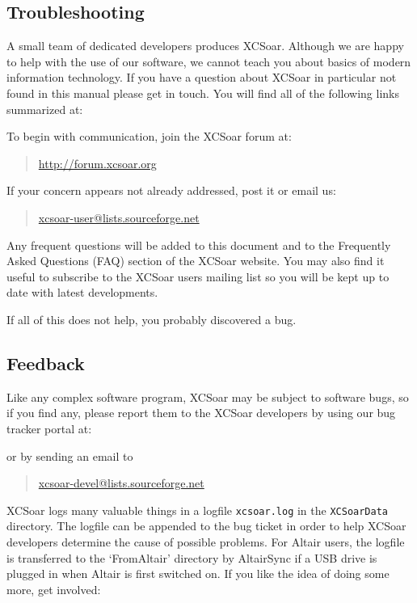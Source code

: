 \subsection*{Troubleshooting}
A small team of dedicated developers produces XCSoar. Although we are
happy to help with the use of our software, we cannot teach you about
basics of modern information technology. If you have a question about XCSoar in
particular not found in this manual please get in touch. You will find all of the following links summarized at:
\begin{quote}
\end{quote}
To begin with communication, join the XCSoar forum at:
\begin{quote}
\url{http://forum.xcsoar.org}
\end{quote}
If your concern appears not already addressed, post it or email us: 
\begin{quote}
\href{mailto:xcsoar-user@lists.sourceforge.net}{xcsoar-user@lists.sourceforge.net}
\end{quote}
Any frequent questions will be added to this document and to the Frequently
Asked Questions (FAQ) section of the XCSoar website.
You may also find it useful to subscribe to the XCSoar users mailing
list so you will be kept up to date with latest developments.

If all of this does not help, you probably discovered a bug.

\subsection*{Feedback}
Like any complex software program, XCSoar may be subject to software
bugs, so if you find any, please report them to the XCSoar developers
by using our bug tracker portal at: 
\begin{quote}
\end{quote}
or by sending an email to
\begin{quote}
\href{mailto:xcsoar-devel@lists.sourceforge.net}{xcsoar-devel@lists.sourceforge.net}
\end{quote}
XCSoar logs many valuable things in a logfile
\verb|xcsoar.log| in the \texttt{XCSoarData} directory. The logfile can be appended to the bug ticket in order to help XCSoar developers determine the cause of possible problems. For Altair users, the logfile is transferred to the `FromAltair' directory by AltairSync if a USB drive is plugged in when Altair is first switched on.
If you like the idea of doing some more, get involved:
\begin{quote}
\end{quote}

